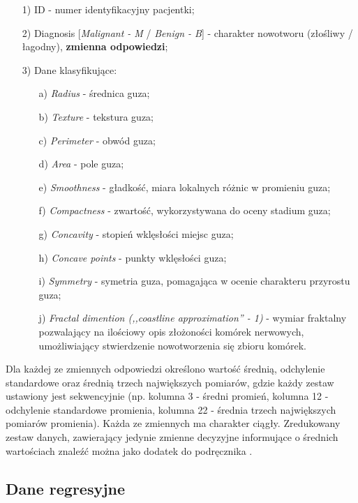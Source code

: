 	\begin{enumerate}
		\item [1)] ID - numer identyfikacyjny pacjentki;
		\item [2)] Diagnosis [\textit{Malignant - M} / \textit{Benign - B}] - charakter nowotworu (złośliwy / łagodny), \textbf{zmienna odpowiedzi};
		\item [3)] Dane klasyfikujące:
			\begin{enumerate}
				\item [a)] \textit{Radius} - średnica guza;
				\item [b)] \textit{Texture} - tekstura guza;
				\item [c)] \textit{Perimeter} - obwód guza;
				\item [d)] \textit{Area} - pole guza;
				\item [e)] \textit{Smoothness} - gładkość, miara lokalnych różnic w promieniu guza;
				\item [f)] \textit{Compactness} - zwartość, wykorzystywana do oceny stadium guza;
				\item [g)] \textit{Concavity} - stopień wklęsłości miejsc guza;
				\item [h)] \textit{Concave points} - punkty wklęsłości guza;
				\item [i)] \textit{Symmetry} - symetria guza, pomagająca w ocenie charakteru przyrostu guza;
				\item [j)] \textit{Fractal dimention (,,coastline approximation'' - 1)} - wymiar fraktalny pozwalający na ilościowy opis złożoności komórek nerwowych, umożliwiający stwierdzenie nowotworzenia się zbioru komórek.
			\end{enumerate}
	\end{enumerate}
	
	Dla każdej ze zmiennych odpowiedzi określono wartość średnią, odchylenie standardowe oraz średnią trzech największych pomiarów, gdzie każdy zestaw ustawiony jest sekwencyjnie (np. kolumna 3 - średni promień, kolumna 12 - odchylenie standardowe promienia, kolumna 22 - średnia trzech największych pomiarów promienia). Każda ze zmiennych ma charakter ciągły. Zredukowany zestaw danych, zawierający jedynie zmienne decyzyjne informujące o średnich wartościach znaleźć można jako dodatek do podręcznika \cite{biostatisticsJMP}.
	
\subsection{Dane regresyjne}


